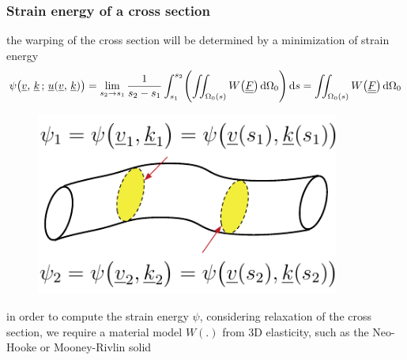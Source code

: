 \begin{frame}
  \frametitle{Strain energy of a cross section}

  the warping of the cross section will be determined by a minimization of strain energy
  \begin{displaymath}
    \psi \bigl( \underline{v} , \, \underline{k} \, ; \, \underline{u}(\underline{v} , \, \underline{k}) \bigr) =
    \lim_{s_2 \to s_1} \frac{1}{s_2 - s_1} \int_{s_1}^{s_2}  \Biggl( \iint_{\Omega_0(s)} W \bigl( \doubleunderline{F} \bigr) \dif \Omega_0 \Biggr) \dif s =
    \iint_{\Omega_0(s)} W \bigl( \doubleunderline{F} \bigr) \dif \Omega_0
  \end{displaymath}

  \vspace{0.3em}
  \begin{figure}
    \centering
    \includegraphics[width=10cm, keepaspectratio=true]{sections/cosserat_rods/images/LocalEnergy}
  \end{figure}
  
  \vspace{0.5em}
  in order to compute the strain energy $\psi$, considering relaxation of the cross section,
  we require a material model $W(.)$ from 3D elasticity, such as the Neo-Hooke or Mooney-Rivlin solid
  
\end{frame}


